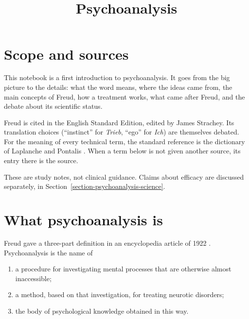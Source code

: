 



\title{Psychoanalysis}
\maketitle

\label{section-phantom}

\tableofcontents

\section{Scope and sources}
\label{section-psychoanalysis-scope}

This notebook is a first introduction to
psychoanalysis. It goes from the big
picture to the details: what the word
means, where the ideas came from, the
main concepts of Freud, how a treatment
works, what came after Freud, and the
debate about its scientific status.

Freud is cited in the English Standard
Edition, edited by James Strachey. Its
translation choices (``instinct'' for
\emph{Trieb}, ``ego'' for \emph{Ich})
are themselves debated. For the meaning
of every technical term, the standard
reference is the dictionary of Laplanche
and Pontalis
\cite{laplanche-pontalis-language}. When
a term below is not given another
source, its entry there is the source.

These are study notes, not clinical
guidance. Claims about efficacy are
discussed separately, in
Section~\ref{section-psychoanalysis-science}.

\section{What psychoanalysis is}
\label{section-what-is-psychoanalysis}

Freud gave a three-part definition in
an encyclopedia article of 1922
\cite{freud-se-18-encyclopaedia}.
Psychoanalysis is the name of

\begin{enumerate}
\item a procedure for investigating
mental processes that are otherwise
almost inaccessible;
\item a method, based on that
investigation, for treating neurotic
disorders;
\item the body of psychological knowledge
obtained in this way.
\end{enumerate}

